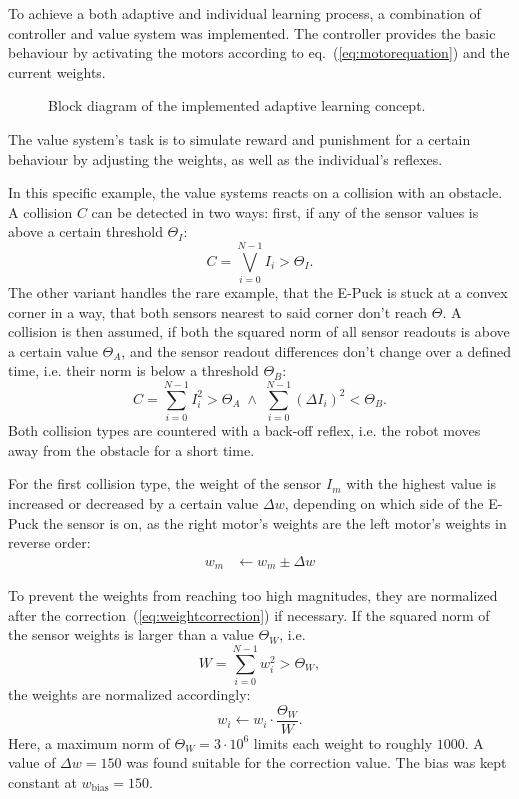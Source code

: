 \documentclass[a4paper]{jacow}
\begin{document}
To achieve a both adaptive and individual learning process, a combination of controller and value system was implemented. The controller provides the basic behaviour by activating the motors according to eq.~(\ref{eq:motorequation}) and the current weights.

\begin{figure}[tbp]
	\centering
	
	\caption{Block diagram of the implemented adaptive learning concept.}
	\label{fig:adaptivelearningsketch}
\end{figure}

The value system's task is to simulate reward and punishment for a certain behaviour by adjusting the weights, as well as the individual's reflexes.

In this specific example, the value systems reacts on a collision with an obstacle. A collision $C$ can be detected in two ways: first, if any of the sensor values is above a certain threshold $\Theta_I$:
\begin{equation}
	C = \bigvee\limits_{i=0}^{N-1} I_i > \Theta_I. 
\end{equation}
The other variant handles the rare example, that the E-Puck is stuck at a convex corner in a way, that both sensors nearest to said corner don't reach $\Theta$. A collision is then assumed, if both the squared norm of all sensor readouts is above a certain value $\Theta_A$, and the sensor readout differences don't change over a defined time, i.e. their norm is below a threshold $\Theta_B$:
\begin{equation}
	C = \sum\limits_{i=0}^{N-1} I_i^2 > \Theta_A \;\wedge\; \sum\limits_{i=0}^{N-1} (\Delta I_i)^2 < \Theta_B.
\end{equation}
Both collision types are countered with a back-off reflex, i.e. the robot moves away from the obstacle for a short time.

For the first collision type, the weight of the sensor $I_m$ with the highest value is increased or decreased by a certain value $\Delta w$, depending on which side of the E-Puck the sensor is on, as the right motor's weights are the left motor's weights in reverse order:
\begin{align}
	w_m &\leftarrow w_m \pm \Delta w\label{eq:weightcorrection}
\end{align}

To prevent the weights from reaching too high magnitudes, they are normalized after the correction~(\ref{eq:weightcorrection}) if necessary. If the squared norm of the sensor weights is larger than a value $\Theta_W$, i.e.
\begin{equation}
	W = \sum\limits_{i=0}^{N-1} w_i^2 > \Theta_W,
\end{equation}
the weights are normalized accordingly:
\begin{equation}
	w_i \leftarrow w_i \cdot \frac{\Theta_W}{W}.
\end{equation}
Here, a maximum norm of $\Theta_W=3\cdot 10^6$ limits each weight to roughly $1000$. A value of $\Delta w = 150$ was found suitable for the correction value. The bias was kept constant at $w_\text{bias} = 150$.
\end{document}
